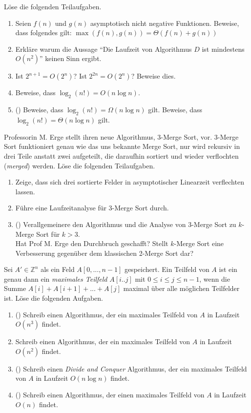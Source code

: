 \documentclass{uebung_cs}
\begin{document}
\begin{aufgabe}
	Löse die folgenden Teilaufgaben.
	\begin{enumerate}
		\item Seien $f(n)$ und $g(n)$ asymptotisch nicht negative Funktionen.
		Beweise, dass folgendes gilt: $\max(f(n),g(n)) = \Theta(f(n) + g(n))$
		\item Erkläre warum die Aussage \enquote{Die Laufzeit von Algorithmus $D$ ist mindestens $O(n^2)$} keinen Sinn ergibt.
		\item Ist $2^{n+1} = O(2^n)$? Ist $2^{2n} = O(2^n)$? Beweise dies.
		\item Beweise, dass $\log_2(n!) = O(n \log n)$.
		\item (\hard) Beweise, dass $\log_2(n!) = \Omega(n\log n)$ gilt.
		Beweise, dass $\log_2(n!) = \Theta(n\log n)$ gilt.
	\end{enumerate}
\end{aufgabe}

\begin{aufgabe}
	Professorin M. Erge stellt ihren neue Algorithmus, 3-Merge Sort, vor.
	3-Merge Sort funktioniert genau wie das uns bekannte Merge Sort, nur wird rekursiv in drei Teile anstatt zwei aufgeteilt, die daraufhin sortiert und wieder verflochten (\textit{merged}) werden.
	Löse die folgenden Teilaufgaben.
	\begin{enumerate}
		\item Zeige, dass sich drei sortierte Felder in asymptotischer Linearzeit verflechten lassen.
		\item Führe eine Laufzeitanalyse für 3-Merge Sort durch.
		\item (\hard) Verallgemeinere den Algorithmus und die Analyse von 3-Merge Sort zu $k$-Merge Sort für $k>3$.\\
		Hat Prof M. Erge den Durchbruch geschafft?
		Stellt $k$-Merge Sort eine Verbesserung gegenüber dem klassischen 2-Merge Sort dar?
	\end{enumerate}
\end{aufgabe}

\begin{aufgabe}
	Sei $A' \in \mathbb{Z}^n$ als ein Feld $A[0, ..., n-1]$ gespeichert.
	Ein Teilfeld von $A$ ist ein genau dann ein \textit{maximales Teilfeld} $A[i..j]$ mit $0\leq i\leq j\leq n-1$, wenn die Summe $A[i] + A[i+1] + ... + A[j]$ maximal über alle möglichen Teilfelder ist.
	Löse die folgenden Aufgaben.
	\begin{enumerate}
		\item (\warmup) Schreib einen Algorithmus, der ein maximales Teilfeld von $A$ in Laufzeit $O(n^3)$ findet.
		\item Schreib einen Algorithmus, der ein maximales Teilfeld von $A$ in Laufzeit $O(n^2)$ findet.
		\item (\hard) Schreib einen \textit{Divide and Conquer} Algorithmus, der ein maximales Teilfeld von $A$ in Laufzeit $O(n\log n)$ findet.
		\item (\veryhard) Schreib einen Algorithmus, der einen maximales Teilfeld von $A$ in Laufzeit $O(n)$ findet.
	\end{enumerate}
\end{aufgabe}
\end{document}
